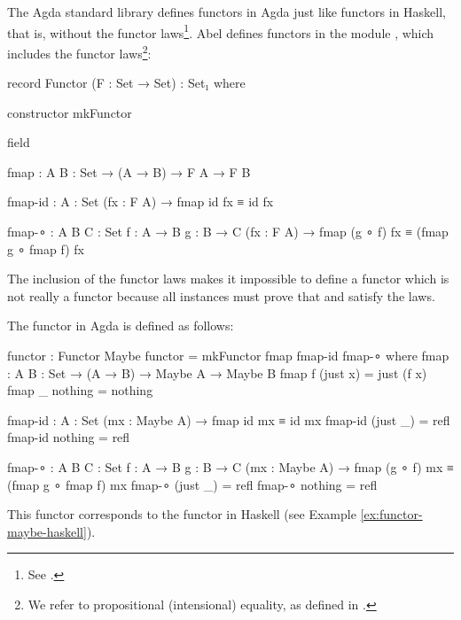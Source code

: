The Agda standard library defines functors in Agda just like functors
in Haskell, that is, without the functor laws\footnote{See
  \parencite[module ]{danielsson-2013}.}.
Abel defines functors in the module ,
which includes the functor laws\footnote{We refer to propositional
  (intensional) equality, as defined in \parencite[module
    ]{danielsson-2013}.}:
\begin{codeagda}
record Functor (F : Set → Set) : Set₁ where

  constructor mkFunctor

  field

    fmap    : {A B : Set} → (A → B) → F A → F B

    fmap-id : {A : Set} (fx : F A) → fmap id fx ≡ id fx

    fmap-∘  : {A B C : Set} {f : A → B} {g : B → C}
              (fx : F A) → fmap (g ∘ f) fx ≡ (fmap g ∘ fmap f) fx
\end{codeagda}
The inclusion of the functor laws makes it impossible to define a
functor which is not really a functor because all instances must prove
that  and  satisfy the laws.

\begin{example}
  \label{ex:functor-maybe-agda}

  The  functor in Agda is defined as follows:
  \begin{codeagda}
functor : Functor Maybe
functor = mkFunctor fmap fmap-id fmap-∘
  where
    fmap : {A B : Set} → (A → B) → Maybe A → Maybe B
    fmap f (just x) = just (f x)
    fmap _ nothing  = nothing

    fmap-id : {A : Set} (mx : Maybe A) → fmap id mx ≡ id mx
    fmap-id (just _) = refl
    fmap-id nothing  = refl

    fmap-∘ : {A B C : Set} {f : A → B} {g : B → C}
             (mx : Maybe A) → fmap (g ∘ f) mx ≡ (fmap g ∘ fmap f) mx
    fmap-∘ (just _) = refl
    fmap-∘ nothing  = refl
  \end{codeagda}
  This functor corresponds to the  functor in
  Haskell (see Example \ref{ex:functor-maybe-haskell}). 

\end{example}

